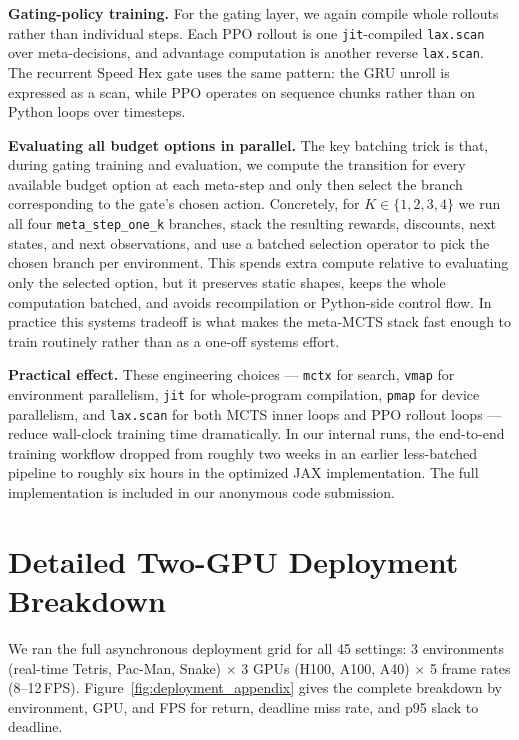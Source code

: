 \documentclass{article}
\begin{document}
\textbf{Gating-policy training.}
For the gating layer, we again compile whole rollouts rather than individual steps.
Each PPO rollout is one \texttt{jit}-compiled \texttt{lax.scan} over meta-decisions,
and advantage computation is another reverse \texttt{lax.scan}. The recurrent Speed
Hex gate uses the same pattern: the GRU unroll is expressed as a scan, while PPO
operates on sequence chunks rather than on Python loops over timesteps.

\textbf{Evaluating all budget options in parallel.}
The key batching trick is that, during gating training and evaluation, we compute
the transition for every available budget option at each meta-step and only then
select the branch corresponding to the gate's chosen action. Concretely, for
$K \in \{1,2,3,4\}$ we run all four \texttt{meta\_step\_one\_k} branches, stack the
resulting rewards, discounts, next states, and next observations, and use a batched
selection operator to pick the chosen branch per environment. This spends extra
compute relative to evaluating only the selected option, but it preserves static
shapes, keeps the whole computation batched, and avoids recompilation or Python-side
control flow. In practice this systems tradeoff is what makes the meta-MCTS stack
fast enough to train routinely rather than as a one-off systems effort.

\textbf{Practical effect.}
These engineering choices --- \texttt{mctx} \citep{deepmind2020jax} for search, \texttt{vmap} for environment
parallelism, \texttt{jit} for whole-program compilation, \texttt{pmap} for device
parallelism, and \texttt{lax.scan} for both MCTS inner loops and PPO rollout loops ---
reduce wall-clock training time dramatically. In our internal runs, the end-to-end
training workflow dropped from roughly two weeks in an earlier less-batched pipeline
to roughly six hours in the optimized JAX implementation. The full implementation is
included in our anonymous code submission.


\section{Detailed Two-GPU Deployment Breakdown}
\label{app:deployment_details}

We ran the full asynchronous deployment grid for all 45 settings:
3 environments (real-time Tetris, Pac-Man, Snake) $\times$ 3 GPUs (H100, A100, A40)
$\times$ 5 frame rates (8--12\,FPS).
Figure~\ref{fig:deployment_appendix} gives the complete breakdown by environment,
GPU, and FPS for return, deadline miss rate, and p95 slack to deadline.
\end{document}
